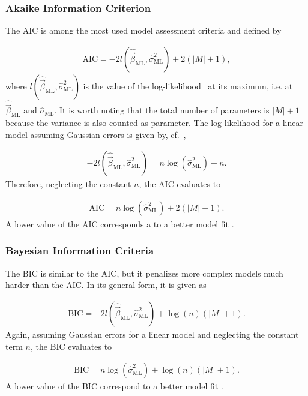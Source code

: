 \subsubsection{Akaike Information Criterion}

The AIC is among the most used model assessment criteria and defined by

\begin{align}
	\text{AIC} = -2 l(\hat{\vec{\beta}}_{\mathrm{ML}}, \hat \sigma^2_{\mathrm{ML}}) + 2(\vert M \vert +1),
\end{align}
%
where $l(\hat{\vec{\beta}}_{\mathrm{ML}}, \hat \sigma^2_{\mathrm{ML}})$ is the value of the log-likelihood~ at its maximum, i.e. at $\hat{\vec{\beta}}_{\mathrm{ML}}$ and $\hat{\sigma}_{\mathrm{ML}}$. It is worth noting that the total number of parameters is $\vert M \vert + 1$ because the variance is also counted as parameter. The log-likelihood for a linear model assuming Gaussian errors is given by, cf.~,

\begin{align}
	-2l(\hat{\vec{\beta}}_{\mathrm{ML}}, \hat \sigma_{\mathrm{ML}}^2) = n \log(\hat \sigma_{\mathrm{ML}}^2) + n.
\end{align}
%
Therefore, neglecting the constant $n$, the AIC evaluates to

\begin{align}
	\text{AIC} = n \log(\hat \sigma^2_{\mathrm{ML}}) + 2(\vert M \vert + 1).
\end{align}
%
A lower value of the AIC corresponds a to a better model fit \cite{fahrmeir2007regression}.

\subsubsection{Bayesian Information Criteria}

The BIC is similar to the AIC, but it penalizes more complex models much harder than the AIC. In its general form, it is given as 

\begin{align}
	\text{BIC} = -2l(\hat{\vec{\beta}}_{\mathrm{ML}}, \hat \sigma^2_{\mathrm{ML}}) + \log(n) (\vert M \vert + 1).
\end{align}
%
Again, assuming Gaussian errors for a linear model and neglecting the constant term $n$, the BIC evaluates to

\begin{align}
	\text{BIC} = n\log(\hat \sigma_{\mathrm{ML}}^2) + \log(n)(\vert M\vert + 1).
\end{align}
%
A lower value of the BIC correspond to a better model fit \cite{fahrmeir2007regression}.

